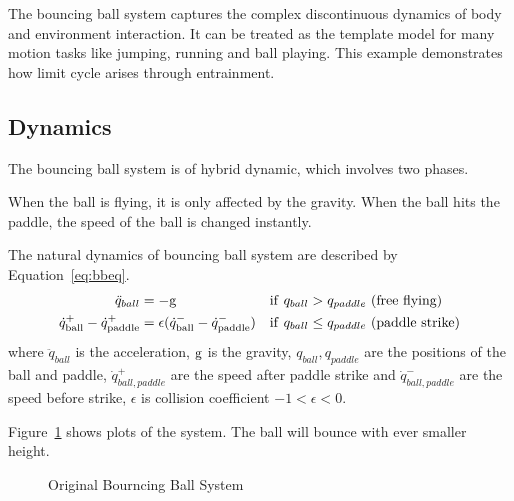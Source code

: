 The bouncing ball system captures the complex discontinuous dynamics of body and environment interaction. 
It can be treated as the template model for many motion tasks like jumping, running and ball playing.
This example demonstrates how limit cycle arises through entrainment.
 
\subsection*{Dynamics}
The bouncing ball system is of hybrid dynamic, which involves two phases.
\begin{itemize}
When the ball is flying, it is only affected by the gravity.
When the ball hits the paddle, the speed of the ball is changed instantly.
\end{itemize}
The natural dynamics of bouncing ball system are described by  Equation~\ref{eq:bbeq}.
\begin{align}
\ddot{q}_{ball}&=-\mathrm{g} &\mathrm{if}\,\,q_{ball} &> q_{paddle}\,\,\mathrm{(free\,\,flying)} \nonumber\\
\dot{q}^{+}_{\mathrm{ball}} - \dot{q}^{+}_{\mathrm{paddle}} &=  \epsilon(\dot{q}^{-}_{\mathrm{ball}} - \dot{q}^{-}_{\mathrm{paddle}})&\mathrm{if}\,\,q_{ball} &\leq {q_{paddle}}\,\,\mathrm{(paddle\,\,strike)}
\label{eq:bbeq}
\end{align}
where $\ddot{q}_{ball}$ is the acceleration,
$\mathrm{g}$ is the gravity,
$q_{ball},q_{paddle}$ are the positions of the ball and paddle,
$\dot{q}^{+}_{ball,paddle}$ are the speed after paddle strike and $\dot{q}^{-}_{ball,paddle}$ are the speed before strike,
$\epsilon$ is collision coefficient $-1 < \epsilon <0$.

Figure~\ref{fig:bborg} shows  plots of the system. 
The ball will bounce with ever smaller height. 




\begin{figure}[h]
\begin{center}
	
\end{center}
\caption{Original Bourncing Ball System}
\label{fig:bborg}
\end{figure}



